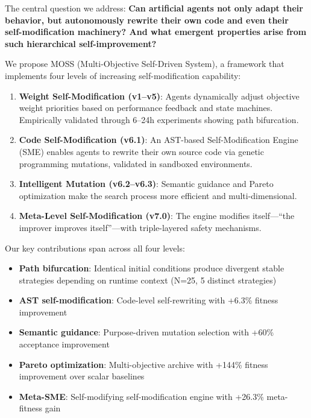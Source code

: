 \documentclass[11pt]{article}
\begin{document}
The central question we address: \textbf{Can artificial agents not only adapt their behavior, but autonomously rewrite their own code and even their self-modification machinery? And what emergent properties arise from such hierarchical self-improvement?}

We propose MOSS (Multi-Objective Self-Driven System), a framework that implements four levels of increasing self-modification capability:

\begin{enumerate}
    \item \textbf{Weight Self-Modification (v1--v5)}: Agents dynamically adjust objective weight priorities based on performance feedback and state machines. Empirically validated through 6--24h experiments showing path bifurcation.
    \item \textbf{Code Self-Modification (v6.1)}: An AST-based Self-Modification Engine (SME) enables agents to rewrite their own source code via genetic programming mutations, validated in sandboxed environments.
    \item \textbf{Intelligent Mutation (v6.2--v6.3)}: Semantic guidance and Pareto optimization make the search process more efficient and multi-dimensional.
    \item \textbf{Meta-Level Self-Modification (v7.0)}: The engine modifies itself---``the improver improves itself''---with triple-layered safety mechanisms.
\end{enumerate}

Our key contributions span across all four levels:
\begin{itemize}
    \item \textbf{Path bifurcation}: Identical initial conditions produce divergent stable strategies depending on runtime context (N=25, 5 distinct strategies)
    \item \textbf{AST self-modification}: Code-level self-rewriting with +6.3\% fitness improvement
    \item \textbf{Semantic guidance}: Purpose-driven mutation selection with +60\% acceptance improvement
    \item \textbf{Pareto optimization}: Multi-objective archive with +144\% fitness improvement over scalar baselines
    \item \textbf{Meta-SME}: Self-modifying self-modification engine with +26.3\% meta-fitness gain
\end{itemize}


\end{document}
